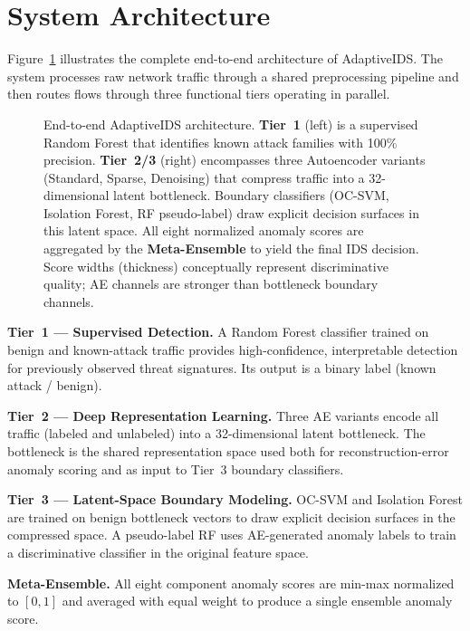 \documentclass[10pt,journal,compsoc]{IEEEtran}
\begin{document}
\section{System Architecture}
\label{sec:arch}

Figure~\ref{fig:arch_overview} illustrates the complete end-to-end
architecture of AdaptiveIDS.  The system processes raw network traffic
through a shared preprocessing pipeline and then routes flows through
three functional tiers operating in parallel.

\begin{figure}[t!]
\centering

\caption{End-to-end AdaptiveIDS architecture.  \textbf{Tier~1} (left)
  is a supervised Random Forest that identifies known attack families
  with 100\% precision.  \textbf{Tier~2/3} (right) encompasses three
  Autoencoder variants (Standard, Sparse, Denoising) that compress
  traffic into a 32-dimensional latent bottleneck.  Boundary
  classifiers (OC-SVM, Isolation Forest, RF pseudo-label) draw
  explicit decision surfaces in this latent space.  All eight normalized
  anomaly scores are aggregated by the \textbf{Meta-Ensemble} to
  yield the final IDS decision.  Score widths (thickness) conceptually
  represent discriminative quality; AE channels are stronger than
  bottleneck boundary channels.}
\label{fig:arch_overview}
\end{figure}

\textbf{Tier~1 — Supervised Detection.}  A Random Forest classifier
trained on benign and known-attack traffic provides high-confidence,
interpretable detection for previously observed threat signatures.
Its output is a binary label (known attack / benign).

\textbf{Tier~2 — Deep Representation Learning.}  Three AE variants
encode all traffic (labeled and unlabeled) into a 32-dimensional
latent bottleneck.  The bottleneck is the shared representation space
used both for reconstruction-error anomaly scoring and as input to
Tier~3 boundary classifiers.

\textbf{Tier~3 — Latent-Space Boundary Modeling.}  OC-SVM and
Isolation Forest are trained on benign bottleneck vectors to draw
explicit decision surfaces in the compressed space.  A pseudo-label
RF uses AE-generated anomaly labels to train a discriminative
classifier in the original feature space.

\textbf{Meta-Ensemble.}  All eight component anomaly scores are
min-max normalized to $[0,1]$ and averaged with equal weight to
produce a single ensemble anomaly score.
\end{document}
